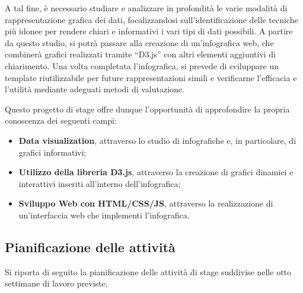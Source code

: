 A tal fine, è necessario studiare e analizzare in profondità le varie modalità di rappresentazione
grafica dei dati, focalizzandosi sull'identificazione delle tecniche più idonee per rendere chiari e
informativi i vari tipi di dati possibili. A partire da questo studio, si potrà passare alla creazione di un'infografica
web, che combinerà grafici realizzati tramite ``D3.js'' con altri elementi aggiuntivi di chiarimento. Una
volta completata l'infografica, si prevede di sviluppare un template riutilizzabile per future rappresentazioni
simili e verificarne l'efficacia e l'utilità mediante adeguati metodi di valutazione. 

Questo progetto di stage offre dunque l'opportunità di approfondire la propria conoscenza dei seguenti campi:
\begin{itemize}
    \item \textbf{Data visualization}, attraverso lo studio di infografiche e, in particolare, di grafici informativi;
    \item \textbf{Utilizzo della libreria D3.js}, attraverso la creazione di grafici dinamici e interattivi inseriti all'interno dell'infografica;
    \item \textbf{Sviluppo Web con HTML/CSS/JS}, attraverso la realizzazione di un'interfaccia web che implementi l'infografica.
\end{itemize}

\subsection{Pianificazione delle attività}
Si riporta di seguito la pianificazione delle attività di stage suddivise 
nelle otto settimane di lavoro previste.

